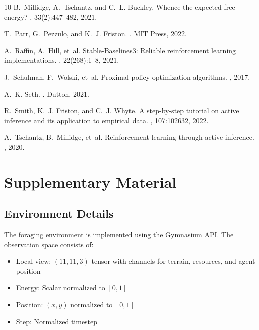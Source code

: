 \documentclass{article}
\begin{document}
\begin{thebibliography}{10}
B.~Millidge, A.~Tschantz, and C.~L. Buckley.
\newblock Whence the expected free energy?
, 33(2):447--482, 2021.

T.~Parr, G.~Pezzulo, and K.~J. Friston.
.
\newblock MIT Press, 2022.

A.~Raffin, A.~Hill, et~al.
\newblock Stable-Baselines3: Reliable reinforcement learning implementations.
, 22(268):1--8, 2021.

J.~Schulman, F.~Wolski, et~al.
\newblock Proximal policy optimization algorithms.
, 2017.

A.~K. Seth.
.
\newblock Dutton, 2021.

R.~Smith, K.~J. Friston, and C.~J. Whyte.
\newblock A step-by-step tutorial on active inference and its application to empirical data.
, 107:102632, 2022.

A.~Tschantz, B.~Millidge, et~al.
\newblock Reinforcement learning through active inference.
, 2020.

\end{thebibliography}

\newpage
\appendix
\section{Supplementary Material}

\subsection{Environment Details}

The foraging environment is implemented using the Gymnasium API. The observation space consists of:
\begin{itemize}
    \item Local view: $(11, 11, 3)$ tensor with channels for terrain, resources, and agent position
    \item Energy: Scalar normalized to $[0, 1]$
    \item Position: $(x, y)$ normalized to $[0, 1]$
    \item Step: Normalized timestep
\end{itemize}
\end{document}
